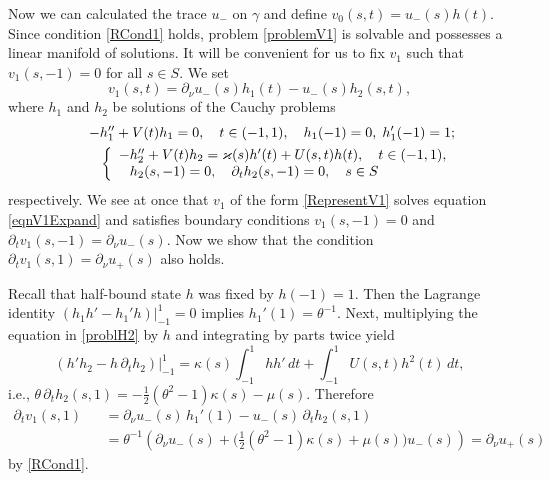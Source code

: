 Now we can calculated the trace $u_-$ on $\gamma$ and  define $v_0(s,t)=u_-(s)h(t)$. Since  condition \eqref{RCond1} holds,
problem \eqref{problemV1} is solvable and possesses a li\-near manifold of
solutions. It will be convenient for us to fix $v_1$ such that $v_1(s,-1)=0$ for all $s\in S$. We set
\begin{equation}\label{RepresentV1}
  v_1(s,t)=\partial_\nu u_-(s)h_1(t)-u_-(s)h_2(s,t),
\end{equation}
where $h_1$ and $h_2$ be solutions of the Cauchy problems
\begin{eqnarray}\nonumber
&&\kern8pt-h_1''+V(t)h_1=0,\quad t\in (-1,1),\quad  h_1(-1)=0, \; h_1'(-1)=1;\\
&&
\left\{
\begin{array}{ll}
-h_2''+V(t)h_2=\kappa(s)h'(t)+U(s,t)h(t),\quad t\in (-1,1),\\\label{problH2}
\phantom{-}h_2(s,-1)=0, \quad \partial_th_2(s,-1)=0,\quad s\in S
\end{array}
\right.
\end{eqnarray}
respectively.
We see at once that  $v_1$ of the form \eqref{RepresentV1} solves equation \eqref{eqnV1Expand} and satisfies boundary conditions $v_1(s,-1)=0$ and $\partial_t v_1(s, -1)=\partial_\nu u_-(s)$. Now we show that the condition $\partial_t v_1(s, 1)=\partial_\nu u_+(s)$ also holds.

Recall that half-bound state $h$ was fixed by  $h(-1)=1$. Then
the Lagrange identity $(h_1h'-h_1'h)|_{-1}^1=0$ implies  $h_1'(1)=\theta^{-1}$.
Next, multiplying the equation in \eqref{problH2} by $h$ and  integrating by parts twice yield
$$
 (h'h_2-h\,\partial_th_2)\big|_{-1}^1=\kappa(s)\int_{-1}^1hh'\,dt
  +\int_{-1}^1U(s,t)h^2(t)\, dt,
$$
i.e., $\theta \,\partial_th_2(s,1)=-\frac{1}{2 }(\theta^2-1)\kappa(s)-\mu(s)$.
Therefore
\begin{eqnarray}\nonumber
\partial_t v_1(s,1)&&=\partial_\nu u_-(s)\,h_1'(1)- u_-(s)\,\partial_th_2(s,1)\\\nonumber
&&=\theta^{-1} \left(\partial_\nu u_-(s)+\big(\textstyle\frac{1}{2 }(\theta^2-1)\kappa(s)+\mu(s)\big)u_-(s)\right)=\partial_\nu u_+(s)
\end{eqnarray}
by \eqref{RCond1}.





